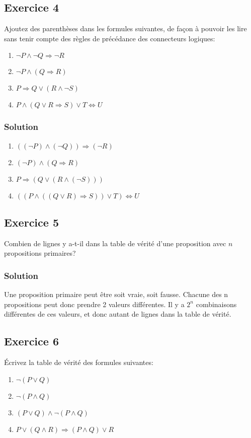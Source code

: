 \subsection*{Exercice 4}
Ajoutez des parenthèses dans les formules suivantes, de façon à pouvoir
les lire sans tenir compte des règles de précédance des connecteurs logiques:
\begin{enumerate}
	\item $\neg P \land \neg Q \Rightarrow \neg R$
	\item $\neg P \land (Q \Rightarrow R)$
	\item $P \Rightarrow Q \lor (R \land \neg S)$
	\item $P \land (Q \lor R \Rightarrow S) \lor T \Leftrightarrow U$
\end{enumerate}


\subsubsection*{Solution}
    \begin{enumerate}
        \item $((\neg P) \land (\neg Q)) \Rightarrow (\neg R)$
        \item $(\neg P) \land (Q \Rightarrow R)$
        \item $P \Rightarrow (Q \lor (R \land (\neg S)))$
        \item $((P \land ((Q \lor R) \Rightarrow S)) \lor T) \Leftrightarrow U$
    \end{enumerate}


\subsection*{Exercice 5}
Combien de lignes y a-t-il dans la table de vérité d'une proposition avec
$n$ propositions primaires?


\subsubsection*{Solution}

    Une proposition primaire peut être soit vraie, soit fausse.
    Chacune des n propositions peut donc prendre 2 valeurs différentes.
    Il y a $2^n$ combinaisons différentes de ces valeurs, et donc autant de lignes dans la table de vérité.

\subsection*{Exercice 6}
Écrivez la table de vérité des formules suivantes:
\begin{enumerate}
	\item $\neg (P \lor Q)$
	\item $\neg (P \land Q)$
	\item $(P \lor Q) \land \neg(P \land Q)$
	\item $P \lor (Q \land R) \Rightarrow (P \land Q) \lor R$
\end{enumerate}


